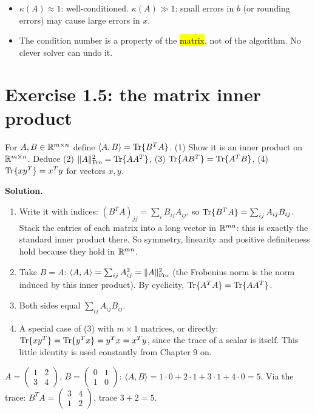 \begin{intuition}[Morals]
\begin{itemize}
  \item $\kappa(A)\approx1$: well-conditioned. $\kappa(A)\gg1$: small errors in $b$ (or rounding errors) may cause large errors in $x$.
  \item The condition number is a property of the \hl{matrix}, not of the algorithm. No clever solver can undo it.
\end{itemize}
\end{intuition}

\section{Exercise 1.5: the matrix inner product}

\begin{example}
For $A,B\in\mathbb{R}^{m\times n}$ define $\langle A,B\rangle=\operatorname{Tr}\{B^TA\}$.
(1) Show it is an inner product on $\mathbb{R}^{m\times n}$. Deduce (2) $\lVert A\rVert_{\mathrm{Fro}}^2=\operatorname{Tr}\{AA^T\}$, (3) $\operatorname{Tr}\{AB^T\}=\operatorname{Tr}\{A^TB\}$,
(4) $\operatorname{Tr}\{xy^T\}=x^Ty$ for vectors $x,y$.
\end{example}

\textbf{Solution.}
\begin{enumerate}
  \item Write it with indices: $(B^TA)_{jj} = \sum_iB_{ij}A_{ij}$, so $\operatorname{Tr}\{B^TA\} = \sum_{ij}A_{ij}B_{ij}$.
        Stack the entries of each matrix into a long vector in $\mathbb{R}^{mn}$: this is exactly the standard inner product there.
        So symmetry, linearity and positive definiteness hold because they hold in $\mathbb{R}^{mn}$.
  \item Take $B=A$: $\langle A,A\rangle = \sum_{ij}A_{ij}^2 = \lVert A\rVert_{\mathrm{Fro}}^2$ (the Frobenius norm is the norm induced by this inner product).
        By cyclicity, $\operatorname{Tr}\{A^TA\}=\operatorname{Tr}\{AA^T\}$.
  \item Both sides equal $\sum_{ij}A_{ij}B_{ij}$.
  \item A special case of (3) with $m\times1$ matrices, or directly: $\operatorname{Tr}\{xy^T\} = \operatorname{Tr}\{y^Tx\} = y^Tx = x^Ty$, since the trace of a scalar is itself.
        This little identity is used constantly from Chapter 9 on.
\end{enumerate}

\begin{example}[Numbers]
$A=\begin{pmatrix}1&2\\3&4\end{pmatrix}$, $B=\begin{pmatrix}0&1\\1&0\end{pmatrix}$: $\langle A,B\rangle = 1\cdot0+2\cdot1+3\cdot1+4\cdot0 = 5$.
Via the trace: $B^TA = \begin{pmatrix}3&4\\1&2\end{pmatrix}$, trace $3+2=5$. \checkmark
\end{example}


